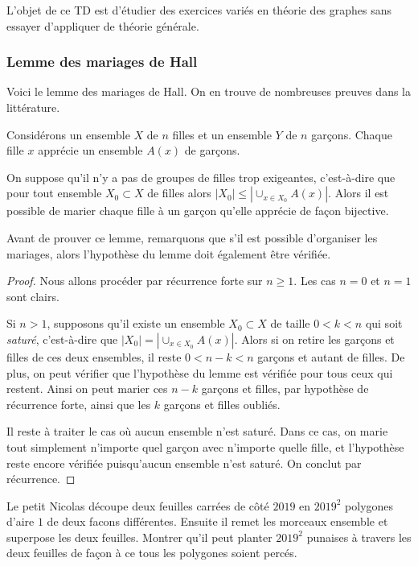 
L'objet de ce TD est d'étudier des exercices variés en théorie des graphes sans essayer d'appliquer de théorie générale.


\subsubsection{Lemme des mariages de Hall}


Voici le lemme des mariages de Hall. On en trouve de nombreuses preuves dans la littérature.


\begin{lem}
Considérons un ensemble $X$ de $n$ filles et un ensemble $Y$ de $n$ garçons. Chaque fille $x$ apprécie un ensemble $A(x)$ de garçons.
\smallskip

On suppose qu'il n'y a pas de groupes de filles trop exigeantes, c'est-à-dire que pour tout ensemble $X_0\subset X$ de filles alors $|X_0| \le |\cup_{x\in X_0} A(x)|$. Alors il est possible de marier chaque fille à un garçon qu'elle apprécie de façon bijective.
\end{lem}

Avant de prouver ce lemme, remarquons que s'il est possible d'organiser les mariages, alors l'hypothèse du lemme doit également être vérifiée.

\begin{proof}
Nous allons procéder par récurrence forte sur $n \ge 1$. Les cas $n = 0$ et $n = 1$ sont clairs.

\medskip

Si $n > 1$, supposons qu'il existe un ensemble $X_0 \subset X$ de taille $0 < k < n$ qui soit \textit{saturé}, c'est-à-dire que $|X_0| = |\cup_{x\in X_0}A(x)|$. Alors si on retire les garçons et filles de ces deux ensembles, il reste $0 < n - k < n$ garçons et autant de filles. De plus, on peut vérifier que l'hypothèse du lemme est vérifiée pour tous ceux qui restent. Ainsi on peut marier ces $n - k$ garçons et filles, par hypothèse de récurrence forte, ainsi que les $k$ garçons et filles oubliés.

Il reste à traiter le cas où aucun ensemble n'est saturé. Dans ce cas, on marie tout simplement n'importe quel garçon avec n'importe quelle fille, et l'hypothèse reste encore vérifiée puisqu'aucun ensemble n'est saturé. On conclut par récurrence.
\end{proof}


\begin{exo}
Le petit Nicolas découpe deux feuilles carrées de côté $2019$ en $2019^2$ polygones d'aire $1$ de deux facons différentes. Ensuite il remet les morceaux ensemble et superpose les deux feuilles. Montrer qu'il peut planter $2019^2$ punaises à travers les deux feuilles de façon à ce tous les polygones soient percés.
\end{exo}


